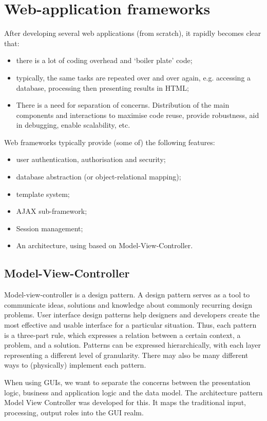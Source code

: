 \documentclass[a4paper, openany]{memoir}
\begin{document}
\section{Web-application frameworks}
After developing several web applications (from scratch), it rapidly becomes clear that:
\begin{itemize}
    \item there is a lot of coding overhead and `boiler plate' code;
    \item typically, the same tasks are repeated over and over again, e.g. accessing a database, processing then presenting results in HTML;
    \item There is a need for separation of concerns. Distribution of the main components and interactions to maximise code reuse, provide robustness, aid in debugging, enable scalability, etc.
\end{itemize}
Web frameworks typically provide (some of) the following features:
\begin{itemize}
    \item user authentication, authorisation and security;
    \item database abstraction (or object-relational mapping);
    \item template system;
    \item AJAX sub-framework;
    \item Session management;
    \item An architecture, using based on Model-View-Controller.
\end{itemize}

\subsection{Model-View-Controller}
Model-view-controller is a design pattern. A design pattern serves as a tool to communicate ideas, solutions and knowledge about commonly recurring design problems. User interface design patterns help designers and developers create the most effective and usable interface for a particular situation. Thus, each pattern is a three-part rule, which expresses a relation between a certain context, a problem, and a solution. Patterns can be expressed hierarchically, with each layer representing a different level of granularity. There may also be many different ways to (physically) implement each pattern.

\noindent When using GUIs, we want to separate the concerns between the presentation logic, business and application logic and the data model. The architecture pattern Model View Controller was developed for this. It maps the traditional input, processing, output roles into the GUI realm.
\end{document}
